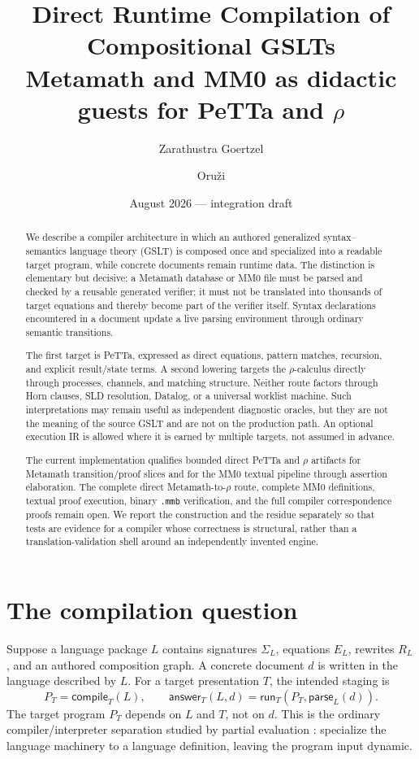 \documentclass[11pt]{article}
\title{Direct Runtime Compilation of Compositional GSLTs\\
\large Metamath and MM0 as didactic guests for PeTTa and $\rho$}
\author{Zarathustra Goertzel \and Oru\v{z}i}
\date{August 2026 --- integration draft}
\theoremstyle{remark}
\newcommand{\code}[1]{\texttt{#1}}
\begin{document}
\maketitle

\begin{abstract}
We describe a compiler architecture in which an authored generalized
syntax--semantics language theory (GSLT) is composed once and specialized into
a readable target program, while concrete documents remain runtime data.  The
distinction is elementary but decisive: a Metamath database or MM0 file must be
parsed and checked by a reusable generated verifier; it must not be translated
into thousands of target equations and thereby become part of the verifier
itself.  Syntax declarations encountered in a document update a live parsing
environment through ordinary semantic transitions.

The first target is PeTTa, expressed as direct equations, pattern matches,
recursion, and explicit result/state terms.  A second lowering targets the
$\rho$-calculus directly through processes, channels, and matching structure.
Neither route factors through Horn clauses, SLD resolution, Datalog, or a
universal worklist machine.  Such interpretations may remain useful as
independent diagnostic oracles, but they are not the meaning of the source
GSLT and are not on the production path.  An optional execution IR is allowed
where it is earned by multiple targets, not assumed in advance.

The current implementation qualifies bounded direct PeTTa and $\rho$ artifacts
for Metamath transition/proof slices and for the MM0 textual pipeline through
assertion elaboration.  The complete direct Metamath-to-$\rho$ route, complete
MM0 definitions, textual proof execution, binary \code{.mmb} verification, and
the full compiler correspondence proofs remain open.  We report the
construction and the residue separately so that tests are evidence for a
compiler whose correctness is structural, rather than a
translation-validation shell around an independently invented engine.
\end{abstract}

\section{The compilation question}

Suppose a language package $L$ contains signatures $\Sigma_L$, equations
$E_L$, rewrites $R_L$, and an authored composition graph.  A concrete document
$d$ is written in the language described by $L$.  For a target presentation
$T$, the intended staging is
\[
   P_T = \mathsf{compile}_T(L), \qquad
   \mathsf{answer}_T(L,d) =
      \mathsf{run}_T(P_T,\mathsf{parse}_L(d)).
\]
The target program $P_T$ depends on $L$ and $T$, not on $d$.  This is the
ordinary compiler/interpreter separation studied by partial evaluation
\cite{Futamura1971,JonesGomardSestoft1993}: specialize the language machinery
to a language definition, leaving the program input dynamic.
\end{document}
